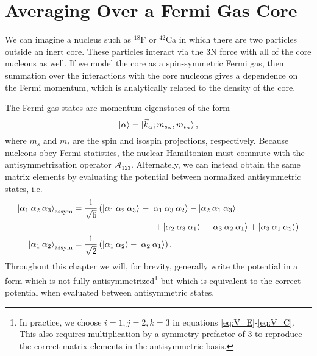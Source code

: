 \section{\label{sec:averaging}Averaging Over a Fermi Gas Core}

We can imagine a nucleus such as $^{18}$F or $^{42}$Ca in which there are two particles outside an inert core. These particles interact via the 3N force with all of the core nucleons as well. If we model the core as a spin-symmetric Fermi gas, then summation over the interactions with the core nucleons gives a dependence on the Fermi momentum, which is analytically related to the density of the core. 

The Fermi gas states are momentum eigenstates of the form
\begin{equation}
\ket{\alpha}=\ket{\vec{k}_\alpha;m_{s_\alpha},m_{t_\alpha}},
\end{equation}
where $m_s$ and $m_t$ are the spin and isospin projections, respectively. %
Because nucleons obey Fermi statistics, the nuclear Hamiltonian must commute with the antisymmetrization operator $\mathcal{A}_{123}$. Alternately, we can instead obtain the same matrix elements by evaluating the potential between normalized antisymmetric states, i.e.
\begin{align}
\ket{\alpha_1\:\alpha_2\:\alpha_3}_{\text{assym}} &= \begin{aligned}[t]\frac{1}{\sqrt{6}} \left( \ket{\alpha_1\:\alpha_2\:\alpha_3}\right. & - \ket{\alpha_1\:\alpha_3\:\alpha_2} - \ket{\alpha_2\:\alpha_1\:\alpha_3}   \\
&\hspace{.5cm}\left. +\ket{\alpha_2\:\alpha_3\:\alpha_1} - \ket{\alpha_3\:\alpha_2\:\alpha_1} + \ket{\alpha_3\:\alpha_1\:\alpha_2} \right)
\end{aligned} \\
\ket{\alpha_1\:\alpha_2}_{\text{assym}} &= \frac{1}{\sqrt{2}} \left( \ket{\alpha_1\:\alpha_2}-\ket{\alpha_2\:\alpha_1}\right).
\end{align}
Throughout this chapter we will, for brevity, generally write the potential in a form which is not fully antisymmetrized\footnote{In practice, we choose $i=1,j=2,k=3$ in equations \eqref{eq:V_E}-\eqref{eq:V_C}. This also requires multiplication by a symmetry prefactor of 3 to reproduce the correct matrix elements in the antisymmetric basis. } but which is equivalent to the correct potential when evaluated between antisymmetric states.


